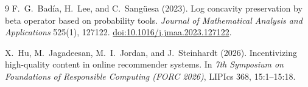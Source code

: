 \documentclass[11pt]{article}
\theoremstyle{definition}
\begin{document}
\begin{thebibliography}{9}
F.~G.~Bad\'ia, H.~Lee, and C.~Sang\"uesa (2023).
Log concavity preservation by beta operator based on probability tools.
\emph{Journal of Mathematical Analysis and Applications} 525(1), 127122.
\href{https://doi.org/10.1016/j.jmaa.2023.127122}{doi:10.1016/j.jmaa.2023.127122}.

X.~Hu, M.~Jagadeesan, M.~I.~Jordan, and J.~Steinhardt (2026).
Incentivizing high-quality content in online recommender systems.
In \emph{7th Symposium on Foundations of Responsible Computing (FORC
2026)}, LIPIcs 368, 15:1--15:18.
\end{thebibliography}
\end{document}

